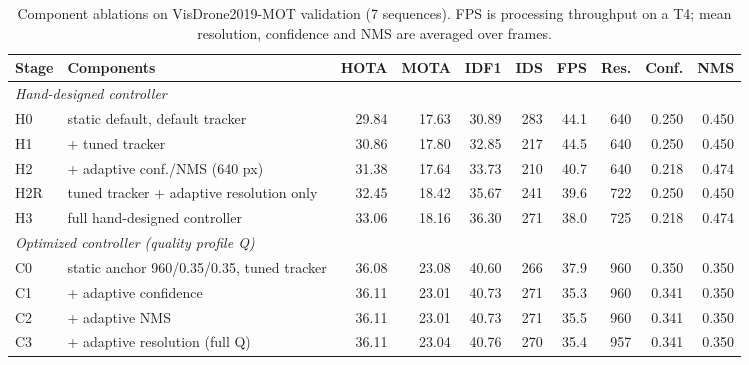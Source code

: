 \begin{table}[t]
\centering
\caption{Component ablations on VisDrone2019-MOT validation (7 sequences). FPS is processing throughput on a T4; mean resolution, confidence and NMS are averaged over frames.}
\label{tab:ablation}
\small
\begin{tabular}{llrrrrrrrr}
\hline
Stage & Components & HOTA & MOTA & IDF1 & IDS & FPS & Res. & Conf. & NMS \\
\hline
\multicolumn{10}{l}{\textit{Hand-designed controller}}\\
H0 & static default, default tracker & 29.84 & 17.63 & 30.89 & 283 & 44.1 & 640 & 0.250 & 0.450 \\
H1 & + tuned tracker & 30.86 & 17.80 & 32.85 & 217 & 44.5 & 640 & 0.250 & 0.450 \\
H2 & + adaptive conf./NMS (640 px) & 31.38 & 17.64 & 33.73 & 210 & 40.7 & 640 & 0.218 & 0.474 \\
H2R & tuned tracker + adaptive resolution only & 32.45 & 18.42 & 35.67 & 241 & 39.6 & 722 & 0.250 & 0.450 \\
H3 & full hand-designed controller & 33.06 & 18.16 & 36.30 & 271 & 38.0 & 725 & 0.218 & 0.474 \\
\multicolumn{10}{l}{\textit{Optimized controller (quality profile Q)}}\\
C0 & static anchor 960/0.35/0.35, tuned tracker & 36.08 & 23.08 & 40.60 & 266 & 37.9 & 960 & 0.350 & 0.350 \\
C1 & + adaptive confidence & 36.11 & 23.01 & 40.73 & 271 & 35.3 & 960 & 0.341 & 0.350 \\
C2 & + adaptive NMS & 36.11 & 23.01 & 40.73 & 271 & 35.5 & 960 & 0.341 & 0.350 \\
C3 & + adaptive resolution (full Q) & 36.11 & 23.04 & 40.76 & 270 & 35.4 & 957 & 0.341 & 0.350 \\
\hline
\end{tabular}
\end{table}
